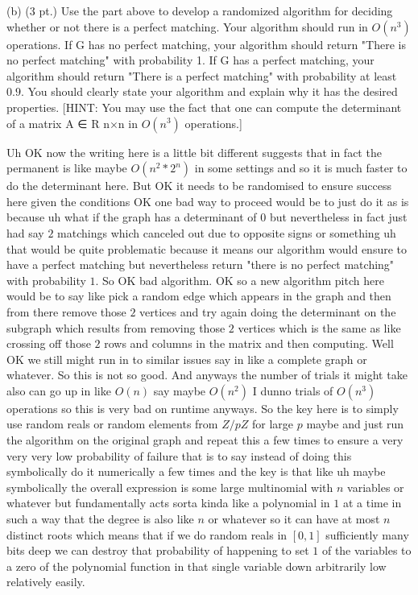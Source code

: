(b) (3 pt.) Use the part above to develop a randomized algorithm for deciding whether or not there is a perfect matching. Your algorithm should run in $O(n^3)$ operations. If G has no perfect matching, your algorithm should return "There is no perfect matching" with probability 1. If G has a perfect matching, your algorithm should return "There is a perfect matching" with probability at least $0.9$. You should clearly state your algorithm and explain why it has the desired properties. [HINT: You may use the fact that one can compute the determinant of a matrix A ∈ R n$\times$n in $O(n^3)$ operations.]

Uh OK now the writing here is a little bit different suggests that in fact the permanent is like maybe $O(n^2*2^n)$ in some settings and so it is much faster to do the determinant here. But OK it needs to be randomised to ensure success here given the conditions OK one bad way to proceed would be to just do it as is because uh what if the graph has a determinant of $0$ but nevertheless in fact just had say $2$ matchings which canceled out due to opposite signs or something uh that would be quite problematic because it means our algorithm would ensure to have a perfect matching but nevertheless return "there is no perfect matching" with probability $1$. So OK bad algorithm. OK so a new algorithm pitch here would be to say like pick a random edge which appears in the graph and then from there remove those $2$ vertices and try again doing the determinant on the subgraph which results from removing those $2$ vertices which is the same as like crossing off those $2$ rows and columns in the matrix and then computing. Well OK we still might run in to similar issues say in like a complete graph or whatever. So this is not so good. And anyways the number of trials it might take also can go up in like $O(n)$ say maybe $O(n^2)$ I dunno trials of $O(n^3)$ operations so this is very bad on runtime anyways. So the key here is to simply use random reals or random elements from $Z/pZ$ for large $p$ maybe and just run the algorithm on the original graph and repeat this a few times to ensure a very very very low probability of failure that is to say instead of doing this symbolically do it numerically a few times and the key is that like uh maybe symbolically the overall expression is some large multinomial with $n$ variables or whatever but fundamentally acts sorta kinda like a polynomial in $1$ at a time in such a way that the degree is also like $n$ or whatever so it can have at most $n$ distinct roots which means that if we do random reals in $[0,1]$ sufficiently many bits deep we can destroy that probability of happening to set $1$ of the variables to a zero of the polynomial function in that single variable down arbitrarily low relatively easily.


